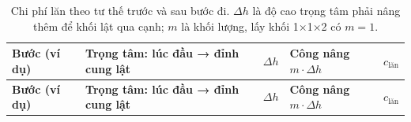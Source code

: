 \begin{longtable}[]{@{}
  >{\raggedright\arraybackslash}p{}
  >{\raggedright\arraybackslash}p{}
  >{\raggedright\arraybackslash}p{}
  >{\raggedright\arraybackslash}p{}
  >{\raggedright\arraybackslash}p{}@{}}
\caption{ Chi phí lăn theo tư thế trước và sau bước đi. \(\Delta h\) là độ cao trọng tâm phải nâng thêm để khối lật qua cạnh; \(m\) là khối lượng, lấy khối 1×1×2 có \(m = 1\).}\tabularnewline
\toprule\noalign{}
\rowcolor{tablehead}\begin{minipage}[b]{\linewidth}\raggedright
\textbf{Bước (ví dụ)}
\end{minipage} & \begin{minipage}[b]{\linewidth}\raggedright
\textbf{Trọng tâm: lúc đầu → đỉnh cung lật}
\end{minipage} & \begin{minipage}[b]{\linewidth}\raggedright
\textbf{\(\Delta h\)}
\end{minipage} & \begin{minipage}[b]{\linewidth}\raggedright
\textbf{Công nâng \(m \cdot \Delta h\)}
\end{minipage} & \begin{minipage}[b]{\linewidth}\raggedright
\textbf{\(c_{\text{lăn}}\)}
\end{minipage} \\
\midrule\noalign{}
\endfirsthead
\toprule\noalign{}
\rowcolor{tablehead}\begin{minipage}[b]{\linewidth}\raggedright
\textbf{Bước (ví dụ)}
\end{minipage} & \begin{minipage}[b]{\linewidth}\raggedright
\textbf{Trọng tâm: lúc đầu → đỉnh cung lật}
\end{minipage} & \begin{minipage}[b]{\linewidth}\raggedright
\textbf{\(\Delta h\)}
\end{minipage} & \begin{minipage}[b]{\linewidth}\raggedright
\textbf{Công nâng \(m \cdot \Delta h\)}
\end{minipage} & \begin{minipage}[b]{\linewidth}\raggedright
\textbf{\(c_{\text{lăn}}\)}
\end{minipage} \\

\end{longtable}
